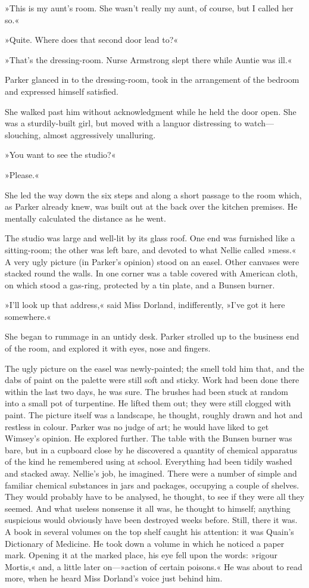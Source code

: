 »This is my aunt's room. She wasn't really my aunt, of course, but I called her so.«

»Quite. Where does that second door lead to?«

»That's the dressing-room. Nurse Armstrong slept there while Auntie was ill.«

Parker glanced in to the dressing-room, took in the arrangement of the bedroom and expressed himself satisfied.

She walked past him without acknowledgment while he held the door open. She was a sturdily-built girl, but moved with a languor distressing to watch\allowbreak---\allowbreak slouching, almost aggressively unalluring.

»You want to see the studio?«

»Please.«

She led the way down the six steps and along a short passage to the room which, as Parker already knew, was built out at the back over the kitchen premises. He mentally calculated the distance as he went.

The studio was large and well-lit by its glass roof. One end was furnished like a sitting-room; the other was left bare, and devoted to what Nellie called »mess.« A very ugly picture (in Parker's opinion) stood on an easel. Other canvases were stacked round the walls. In one corner was a table covered with American cloth, on which stood a gas-ring, protected by a tin plate, and a Bunsen burner.

»I'll look up that address,« said Miss Dorland, indifferently, »I've got it here somewhere.«

She began to rummage in an untidy desk. Parker strolled up to the business end of the room, and explored it with eyes, nose and fingers.

The ugly picture on the easel was newly-painted; the smell told him that, and the dabs of paint on the palette were still soft and sticky. Work had been done there within the last two days, he was sure. The brushes had been stuck at random into a small pot of turpentine. He lifted them out; they were still clogged with paint. The picture itself was a landscape, he thought, roughly drawn and hot and restless in colour. Parker was no judge of art; he would have liked to get Wimsey's opinion. He explored further. The table with the Bunsen burner was bare, but in a cupboard close by he discovered a quantity of chemical apparatus of the kind he remembered using at school. Everything had been tidily washed and stacked away. Nellie's job, he imagined. There were a number of simple and familiar chemical substances in jars and packages, occupying a couple of shelves. They would probably have to be analysed, he thought, to see if they were all they seemed. And what useless nonsense it all was, he thought to himself; anything suspicious would obviously have been destroyed weeks before. Still, there it was. A book in several volumes on the top shelf caught his attention: it was Quain's Dictionary of Medicine. He took down a volume in which he noticed a paper mark. Opening it at the marked place, his eye fell upon the words: »rigour Mortis,« and, a little later on---»action of certain poisons.« He was about to read more, when he heard Miss Dorland's voice just behind him.

